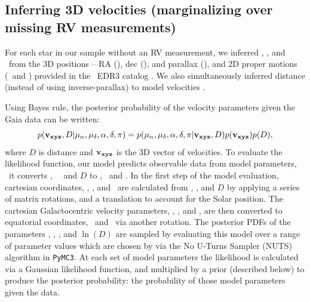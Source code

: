 \subsection{Inferring 3D velocities (marginalizing over missing RV
measurements)}
\label{sec:inference}

For each star in our sample without an RV measurement, we inferred \vx, \vy,
and \vz\ from the 3D positions -- RA (\ra), dec (\dec), and parallax
(\parallax), and 2D proper motions (\mura\ and \mudec) provided in the \gaia\
EDR3 catalog \citep{gaia_edr3}.
We also simultaneously inferred distance (instead of using inverse-parallax)
to model velocities \citep[see \eg][]{bailer-jones2015, bailer-jones2018}.

Using Bayes rule, the posterior probability of the velocity parameters given
the Gaia data can be written:
\begin{equation}
    p({\bf v_{xyz}}, D | \mu_{\alpha}, \mu_{\delta}, \alpha, \delta, \pi) =
    p(\mu_{\alpha}, \mu_{\delta}, \alpha, \delta, \pi | {\bf v_{xyz}}, D)
    p({\bf v_{xyz}}) p(D),
\end{equation}
where $D$ is distance and ${\bf v_{xyz}}$ is the 3D vector of velocities.
To evaluate the likelihood function, our model predicts observable data from
model parameters, \ie\ it converts \vx, \vy\, \vz\ and $D$ to \pmra, \pmdec\
and \parallax.
In the first step of the model evaluation, cartesian coordinates, \x, \y, and
\z\, are calculated from \ra, \dec, and $D$ by applying a series of matrix
rotations, and a translation to account for the Solar position.
The cartesian Galactocentric velocity parameters, \vx, \vy, and \vz, are then
converted to equatorial coordinates, \pmra\ and \pmdec\ via another rotation.
The posterior PDFs of the parameters \vx, \vy, \vz, and $\ln(D)$ are sampled
by evaluating this model over a range of parameter values which are chosen by
via the No U-Turns Sampler (NUTS) algorithm in {\tt PyMC3}.
At each set of model parameters the likelihood is calculated via a Gaussian
likelihood function, and multiplied by a prior (described below) to produce
the posterior probability: the probability of those model parameters given the
data.

